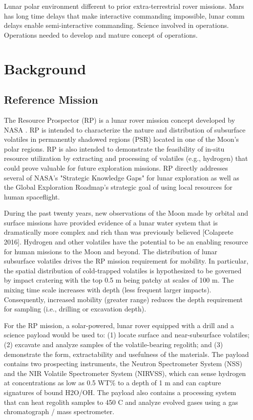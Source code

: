 \documentclass[twocolumn,letterpaper]{IEEEAerospaceCLS}  %
\begin{document}
Lunar polar environment different to prior extra-terrestrial rover missions. Mars has long time delays that make interactive commanding impossible, lunar comm delays enable semi-interactive commanding. Science involved in operations. Operations needed to develop and mature concept of operations.  

\section{Background}
\label{sec:background}

\subsection{Reference Mission}
The Resource Prospector (RP) is a lunar rover mission concept developed by NASA \cite{andrews2015resource,colaprete2015resource}. RP is intended to characterize the nature and distribution of subsurface volatiles in permanently shadowed regions (PSR) located in one of the Moon's polar regions. RP is also intended to demonstrate the feasibility of in-situ resource utilization by extracting and processing of volatiles (e.g., hydrogen) that could prove valuable for future exploration missions. RP directly addresses several of NASA's "Strategic Knowledge Gaps" for lunar exploration as well as the Global Exploration Roadmap's strategic goal of using local resources for human spaceflight.

During the past twenty years, new observations of the Moon made by orbital and surface missions have provided evidence of a lunar water system that is dramatically more complex and rich than was previously believed [Colaprete 2016]. Hydrogen and other volatiles have the potential to be an enabling resource for human missions to the Moon and beyond. The distribution of lunar subsurface volatiles drives the RP mission requirement for mobility. In particular, the spatial distribution of cold-trapped volatiles is hypothesized to be governed by impact cratering with the top 0.5 m being patchy at scales of 100 m. The mixing time scale increases with depth (less frequent larger impacts). Consequently, increased mobility (greater range) reduces the depth requirement for sampling (i.e., drilling or excavation depth).

For the RP mission, a solar-powered, lunar rover equipped with a drill and a science payload would be used to: (1) locate surface and near-subsurface volatiles; (2) excavate and analyze samples of the volatile-bearing regolith; and (3) demonstrate the form, extractability and usefulness of the materials. The payload contains two prospecting instruments, the Neutron Spectrometer System (NSS) and the NIR Volatile Spectrometer System (NIRVSS), which can sense hydrogen at concentrations as low as 0.5 WT\% to a depth of 1 m and can capture signatures of bound H2O/OH. The payload also contains a processing system that can heat regolith samples to 450 C and analyze evolved gases using a gas chromatograph / mass spectrometer.
\end{document}
